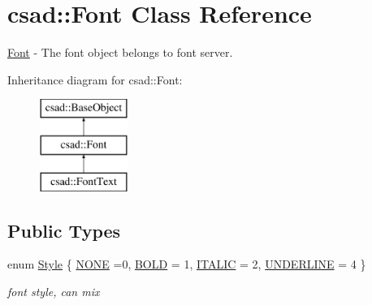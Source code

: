\hypertarget{classcsad_1_1_font}{\section{csad\-:\-:Font Class Reference}
\label{classcsad_1_1_font}
}


\hyperlink{classcsad_1_1_font}{Font} -\/ The font object belongs to font server.  


Inheritance diagram for csad\-:\-:Font\-:\begin{figure}[H]
\begin{center}
\leavevmode
\includegraphics[height=3.000000cm]{classcsad_1_1_font}
\end{center}
\end{figure}
\subsection*{Public Types}
\begin{DoxyCompactItemize}
\item 
enum \hyperlink{classcsad_1_1_font_ae188d2f78967da23f4480c8c97ec7278}{Style} \{ \hyperlink{classcsad_1_1_font_ae188d2f78967da23f4480c8c97ec7278ab78e8c4ad9b4d68b50564b907448da6f}{N\-O\-N\-E} =0, 
\hyperlink{classcsad_1_1_font_ae188d2f78967da23f4480c8c97ec7278a78651b721318d08e8c454ce5163bb490}{B\-O\-L\-D} = 1, 
\hyperlink{classcsad_1_1_font_ae188d2f78967da23f4480c8c97ec7278ae0a0136bf3a895e6fd082a12aebc2976}{I\-T\-A\-L\-I\-C} = 2, 
\hyperlink{classcsad_1_1_font_ae188d2f78967da23f4480c8c97ec7278af4744703dcad7752115abee438ff4afb}{U\-N\-D\-E\-R\-L\-I\-N\-E} = 4
 \}
\begin{DoxyCompactList}\small\item\em font style, can mix \end{DoxyCompactList}\end{DoxyCompactItemize}
